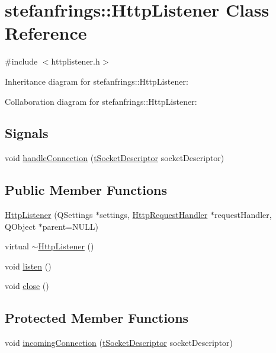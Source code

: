\hypertarget{classstefanfrings_1_1_http_listener}{}\section{stefanfrings\+:\+:Http\+Listener Class Reference}
\label{classstefanfrings_1_1_http_listener}


{\ttfamily \#include $<$httplistener.\+h$>$}



Inheritance diagram for stefanfrings\+:\+:Http\+Listener\+:


Collaboration diagram for stefanfrings\+:\+:Http\+Listener\+:
\subsection*{Signals}
\begin{DoxyCompactItemize}
\item 
void \mbox{\hyperlink{classstefanfrings_1_1_http_listener_a60065df255188a04088d3a7c0b3def44}{handle\+Connection}} (\mbox{\hyperlink{httpconnectionhandler_8h_a9884f8c3364a6510f6118c5336fd0458}{t\+Socket\+Descriptor}} socket\+Descriptor)
\end{DoxyCompactItemize}
\subsection*{Public Member Functions}
\begin{DoxyCompactItemize}
\item 
\mbox{\hyperlink{classstefanfrings_1_1_http_listener_a5ef569cd134e6bd457db70bc1fc01ef2}{Http\+Listener}} (Q\+Settings $\ast$settings, \mbox{\hyperlink{classstefanfrings_1_1_http_request_handler}{Http\+Request\+Handler}} $\ast$request\+Handler, Q\+Object $\ast$parent=N\+U\+LL)
\item 
virtual \mbox{\hyperlink{classstefanfrings_1_1_http_listener_abf6e9c9d9715a94d922a1d437e02ee6e}{$\sim$\+Http\+Listener}} ()
\item 
void \mbox{\hyperlink{classstefanfrings_1_1_http_listener_a39cf1136caf6ba96554ef0a48fbff052}{listen}} ()
\item 
void \mbox{\hyperlink{classstefanfrings_1_1_http_listener_a5f5f2463036bc9a17f9fe8eb5c17c7f5}{close}} ()
\end{DoxyCompactItemize}
\subsection*{Protected Member Functions}
\begin{DoxyCompactItemize}
\item 
void \mbox{\hyperlink{classstefanfrings_1_1_http_listener_a72530470ad6a62487b7b0d3d5c79d7b9}{incoming\+Connection}} (\mbox{\hyperlink{httpconnectionhandler_8h_a9884f8c3364a6510f6118c5336fd0458}{t\+Socket\+Descriptor}} socket\+Descriptor)
\end{DoxyCompactItemize}


